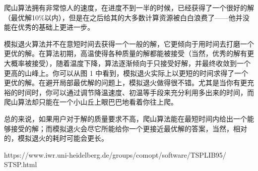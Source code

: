 爬山算法拥有非常惊人的速度，在进度不到一半的时候，已经获得了一个很好的解（最优解10\%以内），但是在之后给其的大多数计算资源被白白浪费了——他并没能在优秀的基础上更进一步。

模拟退火算法并不在意短时间去获得一个一般的解，它更倾向于用时间去打磨一个更优的解。在算法初期，高温使得各种质量的解都能被接受（当然，优秀的解有更大概率被接受），随着温度下降，算法逐渐倾向于只接受好解，并最终收敛到一个更高的山峰上。你可以从图 1 中看到，模拟退火实际上以更短的时间求得了一个更优的解。在避开局部最优解的问题上，模拟退火做得很不错。尤其是当你有更充裕的时间时，你可以通过调节降温速度、初温等手段来充分利用多出来的时间，而爬山算法却只能在一个小山丘上眼巴巴地看着你往上爬。

总的来说，如果用户对于解的质量要求不高，爬山算法能在最短时间内给出一个能够接受的解；而模拟退火会尽它所能给你一个更接近最优解的答案，当然，相对的，模拟退火的耗时可能会更长。

\begin{thebibliography}{}
 https://www.iwr.uni-heidelberg.de/groups/comopt/software/TSPLIB95/
STSP.html
\end{thebibliography}

